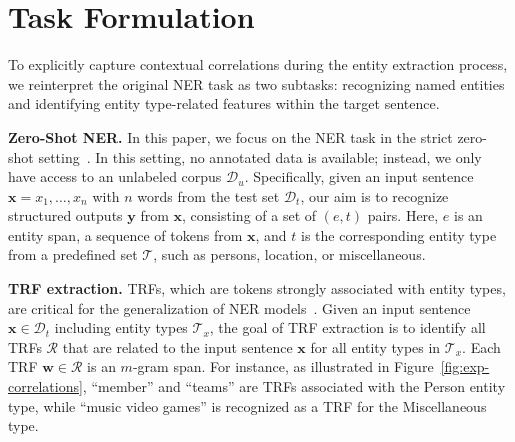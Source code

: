 \section{Task Formulation}
\label{sec:formulation-chapter5}
To explicitly capture contextual correlations during the entity extraction process, we reinterpret the original \ac{NER} task as two subtasks: recognizing named entities and identifying entity type-related features within the target sentence.

\noindent \textbf{Zero-Shot NER.}
In this paper, we focus on the \ac{NER} task in the strict zero-shot setting~\cite{DBLP:journals/corr/abs-2311-08921}. In this setting, no annotated data is available; instead, we only have access to an unlabeled corpus $\mathcal{D}_{u}$. Specifically, given an input sentence $\mathbf{x} = x_{1},\ldots,x_{n}$ with $n$ words from the test set $\mathcal{D}_{t}$, our aim is to recognize structured outputs $\mathbf{y}$ from $\mathbf{x}$, consisting of a set of $(e, t)$ pairs. Here, $e$ is an entity span, a sequence of tokens from $\mathbf{x}$, and $t$ is the corresponding entity type from a predefined set $\mathcal{T}$, such as persons, location, or miscellaneous.

\noindent \textbf{TRF extraction.}
\Acfp{TRF}, which are tokens strongly associated with entity types, are critical for the generalization of \ac{NER} models~\citep{DBLP:conf/emnlp/WangZCRRR23}.
Given an input sentence $\mathbf{x}\in \mathcal{D}_{t}$ including entity types $\mathcal{T}_{x}$, the goal of \ac{TRF} extraction is to identify all \acp{TRF} $\mathcal{R}$ that are related to the input sentence $\mathbf{x}$ for all entity types in $ \mathcal{T}_{x}$. Each \ac{TRF} $\mathbf{w}\in\mathcal{R}$ is an $m$-gram span. For instance, as illustrated in Figure~\ref{fig:exp-correlations}, ``member'' and ``teams'' are \acp{TRF} associated with the Person entity type, while ``music video games'' is recognized as a \ac{TRF} for the Miscellaneous type.